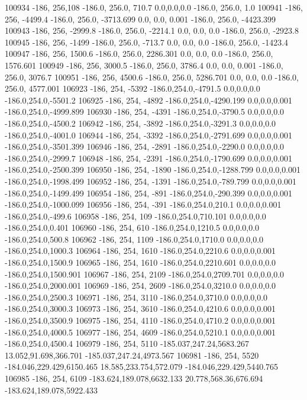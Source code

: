 100934	-186, 256,108	-186.0, 256.0, 710.7	0.0,0.0,0.0	-186.0, 256.0, 1.0
100941	-186, 256, -4499.4	-186.0, 256.0, -3713.699	0.0, 0.0, 0.001	-186.0, 256.0, -4423.399
100943	-186, 256, -2999.8	-186.0, 256.0, -2214.1	0.0, 0.0, 0.0	-186.0, 256.0, -2923.8
100945	-186, 256, -1499	-186.0, 256.0, -713.7	0.0, 0.0, 0.0	-186.0, 256.0, -1423.4
100947	-186, 256, 1500.6	-186.0, 256.0, 2286.301	0.0, 0.0, 0.0	-186.0, 256.0, 1576.601
100949	-186, 256, 3000.5	-186.0, 256.0, 3786.4	0.0, 0.0, 0.001	-186.0, 256.0, 3076.7
100951	-186, 256, 4500.6	-186.0, 256.0, 5286.701	0.0, 0.0, 0.0	-186.0, 256.0, 4577.001
106923	-186, 254, -5392	-186.0,254.0,-4791.5	0.0,0.0,0.0	-186.0,254.0,-5501.2
106925	-186, 254, -4892	-186.0,254.0,-4290.199	0.0,0.0,0.001	-186.0,254.0,-4999.899
106930	-186, 254, -4391	-186.0,254.0,-3790.5	0.0,0.0,0.0	-186.0,254.0,-4500.2
106942	-186, 254, -3892	-186.0,254.0,-3291.3	0.0,0.0,0.0	-186.0,254.0,-4001.0
106944	-186, 254, -3392	-186.0,254.0,-2791.699	0.0,0.0,0.001	-186.0,254.0,-3501.399
106946	-186, 254, -2891	-186.0,254.0,-2290.0	0.0,0.0,0.0	-186.0,254.0,-2999.7
106948	-186, 254, -2391	-186.0,254.0,-1790.699	0.0,0.0,0.001	-186.0,254.0,-2500.399
106950	-186, 254, -1890	-186.0,254.0,-1288.799	0.0,0.0,0.001	-186.0,254.0,-1998.499
106952	-186, 254, -1391	-186.0,254.0,-789.799	0.0,0.0,0.001	-186.0,254.0,-1499.499
106954	-186, 254, -891	-186.0,254.0,-290.399	0.0,0.0,0.001	-186.0,254.0,-1000.099
106956	-186, 254, -391	-186.0,254.0,210.1	0.0,0.0,0.001	-186.0,254.0,-499.6
106958	-186, 254, 109	-186.0,254.0,710.101	0.0,0.0,0.0	-186.0,254.0,0.401
106960	-186, 254, 610	-186.0,254.0,1210.5	0.0,0.0,0.0	-186.0,254.0,500.8
106962	-186, 254, 1109	-186.0,254.0,1710.0	0.0,0.0,0.0	-186.0,254.0,1000.3
106964	-186, 254, 1610	-186.0,254.0,2210.6	0.0,0.0,0.001	-186.0,254.0,1500.9
106965	-186, 254, 1610	-186.0,254.0,2210.601	0.0,0.0,0.0	-186.0,254.0,1500.901
106967	-186, 254, 2109	-186.0,254.0,2709.701	0.0,0.0,0.0	-186.0,254.0,2000.001
106969	-186, 254, 2609	-186.0,254.0,3210.0	0.0,0.0,0.0	-186.0,254.0,2500.3
106971	-186, 254, 3110	-186.0,254.0,3710.0	0.0,0.0,0.0	-186.0,254.0,3000.3
106973	-186, 254, 3610	-186.0,254.0,4210.6	0.0,0.0,0.001	-186.0,254.0,3500.9
106975	-186, 254, 4110	-186.0,254.0,4710.2	0.0,0.0,0.001	-186.0,254.0,4000.5
106977	-186, 254, 4609	-186.0,254.0,5210.1	0.0,0.0,0.001	-186.0,254.0,4500.4
106979	-186, 254, 5110	-185.037,247.24,5683.267	13.052,91.698,366.701	-185.037,247.24,4973.567
106981	-186, 254, 5520	-184.046,229.429,6150.465	18.585,233.754,572.079	-184.046,229.429,5440.765
106985	-186, 254, 6109	-183.624,189.078,6632.133	20.778,568.36,676.694	-183.624,189.078,5922.433
